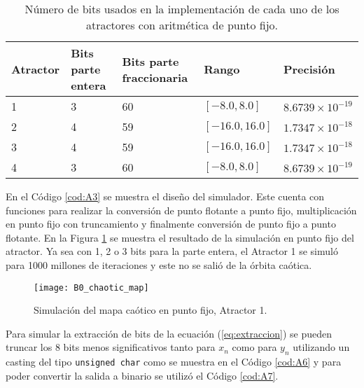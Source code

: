         \begin{table}[htbp]
            \centering
            \caption{Número de bits usados en la implementación de cada uno de los atractores con aritmética de punto fijo.}
            \begin{tabular}{|l|l|l|l|l|}
                \hline
                \rowcolor{lightgray} Atractor  & Bits parte entera & Bits parte fraccionaria & Rango  & Precisión\\
                \hline
                1     & 3                   & 60   & $[-8.0, 8.0]$   & $8.6739 \times 10^{-19}$\\
                \hline
                2     & 4                   & 59   & $[-16.0, 16.0]$ & $1.7347 \times 10^{-18}$\\
                \hline
                3     & 4                   & 59   & $[-16.0, 16.0]$ & $1.7347 \times 10^{-18}$\\
                \hline
                4     & 3                   & 60   & $[-8.0, 8.0]$   & $8.6739 \times 10^{-19}$\\
                \hline
            \end{tabular}
            \label{tab:bits_atractores}
        \end{table}

     En el Código \ref{cod:A3} se muestra el diseño del simulador. Este cuenta con funciones para realizar la conversión de punto flotante a punto fijo, multiplicación en punto fijo con truncamiento y finalmente conversión de punto fijo a punto flotante. En la Figura \ref{fig:B0_chaotic_map} se muestra el resultado de la simulación en punto fijo del atractor. Ya sea con 1, 2 o 3 bits para la parte entera, el Atractor 1 se simuló para 1000 millones de iteraciones y este no se salió de la órbita caótica.

        \begin{figure}[h!]
            \caption{Simulación del mapa caótico en punto fijo, Atractor 1.}
            \centering
            \texttt{[image: B0\_chaotic\_map]}
            \label{fig:B0_chaotic_map}
        \end{figure}

        Para simular la extracción de bits de la ecuación (\ref{eq:extraccion}) se pueden truncar los 8 bits menos significativos tanto para $x_{n}$ como para $y_{n}$ utilizando un casting del tipo \verb|unsigned char| como se muestra en el Código \ref{cod:A6} y para poder convertir la salida a binario se utilizó el Código \ref{cod:A7}.
        
